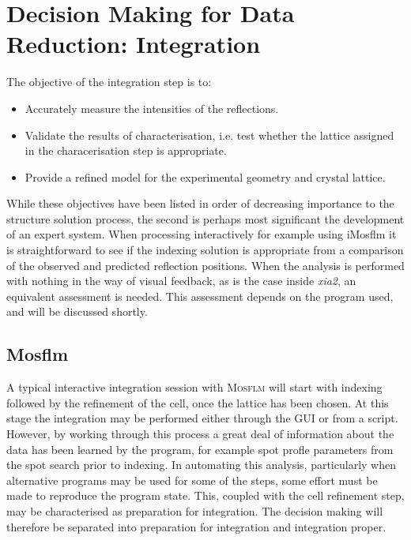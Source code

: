 \documentclass[preprint,pdf]{iucr}
\begin{document}

\section{Decision Making for Data Reduction: Integration}

The objective of the integration step is to:

\begin{itemize}
\item{Accurately measure the intensities of the reflections.}
\item{Validate the results of characterisation, i.e. test whether the
    lattice assigned in the characerisation step is appropriate.}
\item{Provide a refined model for the experimental geometry and
    crystal lattice.}
\end{itemize}

\noindent
While these objectives have been listed in order of decreasing
importance to the structure solution process, the second is perhaps
most significant the development of an expert system. When processing
interactively for example using iMosflm it is
straightforward to see if the indexing solution is appropriate from a
comparison of the observed and predicted reflection positions. When
the analysis is performed with nothing in the way of visual feedback,
as is the case inside \emph{xia2}, an equivalent assessment is
needed. This assessment depends on the program used, and will be
discussed shortly.

\subsection{Mosflm}

A typical interactive integration session with \textsc{Mosflm} will start with
indexing followed by the refinement of the cell, once the lattice has
been chosen. At this stage the integration may be performed either
through the GUI or from a script. However, by working through this
process a great deal of information about the data has been learned by
the program, for example spot profle parameters from the spot search
prior to indexing. In automating this analysis, particularly when
alternative programs may be used for some of the steps, some effort
must be made to reproduce the program state. This, coupled with the
cell refinement step, may be characterised as preparation for
integration. The decision making will therefore be separated into
preparation for integration and integration proper.
\end{document}
